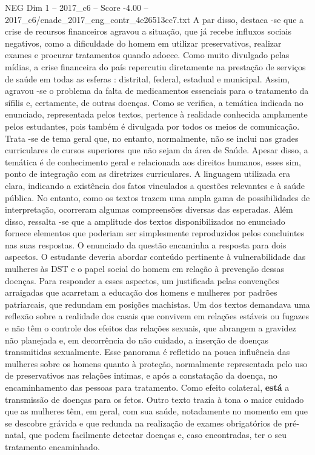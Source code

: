\begin{textsample}{NEG Dim 1 – 2017\_c6 – Score -4.00 – 2017\_c6/enade\_2017\_eng\_contr\_4e26513cc7.txt}
A par disso, destaca -se que a crise de recursos financeiros agravou a situação, que já recebe influxos sociais negativos, como a dificuldade do homem em utilizar preservativos, realizar exames e procurar tratamentos quando adoece.
Como muito divulgado pelas mídias, a crise financeira do país repercutiu diretamente na prestação de serviços de saúde em todas as esferas : distrital, federal, estadual e municipal.
Assim, agravou -se o problema da falta de medicamentos essenciais para o tratamento da sífilis e, certamente, de outras doenças.
Como se verifica, a temática indicada no enunciado, representada pelos textos, pertence à realidade conhecida amplamente pelos estudantes, pois também é divulgada por todos os meios de comunicação.
Trata -se de tema geral que, no entanto, normalmente, não se inclui nas grades curriculares de cursos superiores que não sejam da área de Saúde.
Apesar disso, a temática é de conhecimento geral e relacionada aos direitos humanos, esses sim, ponto de integração com as diretrizes curriculares.
A linguagem utilizada era clara, indicando a existência dos fatos vinculados a questões relevantes e à saúde pública.
No entanto, como os textos trazem uma ampla gama de possibilidades de interpretação, ocorreram algumas compreensões diversas das esperadas.
Além disso, ressalta -se que a amplitude dos textos disponibilizados no enunciado fornece elementos que poderiam ser simplesmente reproduzidos pelos concluintes nas suas respostas.
O enunciado da questão encaminha a resposta para dois aspectos.
O estudante deveria abordar conteúdo pertinente à vulnerabilidade das mulheres às DST e o papel social do homem em relação à prevenção dessas doenças.
Para responder a esses aspectos, um justificada pelas convenções arraigadas que acarretam a educação dos homens e mulheres por padrões patriarcais, que redundam em posições machistas.
Um dos textos demandava uma reflexão sobre a realidade dos casais que convivem em relações estáveis ou fugazes e não têm o controle dos efeitos das relações sexuais, que abrangem a gravidez não planejada e, em decorrência do não cuidado, a inserção de doenças transmitidas sexualmente.
Esse panorama é refletido na pouca influência das mulheres sobre os homens quanto à proteção, normalmente representada pelo uso de preservativos nas relações intimas, e após a constatação da doença, no encaminhamento das pessoas para tratamento.
Como efeito colateral, \textbf{está} a transmissão de doenças para os fetos.
Outro texto trazia à tona o maior cuidado que as mulheres têm, em geral, com sua saúde, notadamente no momento em que se descobre grávida e que redunda na realização de exames obrigatórios de pré-natal, que podem facilmente detectar doenças e, caso encontradas, ter o seu tratamento encaminhado.

\end{textsample}
